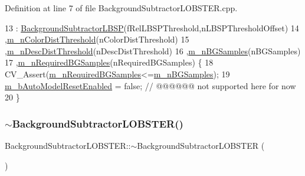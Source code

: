 Definition at line 7 of file Background\+Subtractor\+L\+O\+B\+S\+T\+E\+R.\+cpp.


\begin{DoxyCode}
13     :    \mbox{\hyperlink{class_background_subtractor_l_b_s_p_a5f7f42ea5c9697479cbe237b49ca6ae9}{BackgroundSubtractorLBSP}}(fRelLBSPThreshold,nLBSPThresholdOffset)
14         ,\mbox{\hyperlink{class_background_subtractor_l_o_b_s_t_e_r_a37a37a0a46fc8e33d954c33c1318d7b2}{m\_nColorDistThreshold}}(nColorDistThreshold)
15         ,\mbox{\hyperlink{class_background_subtractor_l_o_b_s_t_e_r_abe3f4a836343e901746e4f243f5252e4}{m\_nDescDistThreshold}}(nDescDistThreshold)
16         ,\mbox{\hyperlink{class_background_subtractor_l_o_b_s_t_e_r_a20c53540b952d608d849a305fd5eed89}{m\_nBGSamples}}(nBGSamples)
17         ,\mbox{\hyperlink{class_background_subtractor_l_o_b_s_t_e_r_acb558aefc1b6205a63c1906b6fd1eeff}{m\_nRequiredBGSamples}}(nRequiredBGSamples) \{
18     CV\_Assert(\mbox{\hyperlink{class_background_subtractor_l_o_b_s_t_e_r_acb558aefc1b6205a63c1906b6fd1eeff}{m\_nRequiredBGSamples}}<=\mbox{\hyperlink{class_background_subtractor_l_o_b_s_t_e_r_a20c53540b952d608d849a305fd5eed89}{m\_nBGSamples}});
19     \mbox{\hyperlink{class_background_subtractor_l_b_s_p_a9d260f4e42e3fc79fb21af950ca9087a}{m\_bAutoModelResetEnabled}} = \textcolor{keyword}{false}; \textcolor{comment}{// @@@@@@ not supported here for now}
20 \}
\end{DoxyCode}
\mbox{\label{class_background_subtractor_l_o_b_s_t_e_r_a249ab359859ee9d439cd130d4271edd6}} 
\subsubsection{\texorpdfstring{$\sim$\+Background\+Subtractor\+L\+O\+B\+S\+T\+E\+R()}{~BackgroundSubtractorLOBSTER()}}
{\footnotesize\ttfamily Background\+Subtractor\+L\+O\+B\+S\+T\+E\+R\+::$\sim$\+Background\+Subtractor\+L\+O\+B\+S\+T\+ER (\begin{DoxyParamCaption}{ }\end{DoxyParamCaption})\hspace{0.3cm}{\ttfamily [virtual]}}



